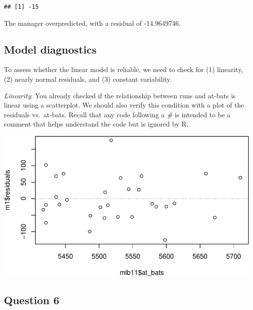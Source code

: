 \documentclass[]{article}
\newenvironment{Shaded}{\begin{snugshade}}{\end{snugshade}}
\newcommand{\KeywordTok}[1]{\textcolor[rgb]{0.13,0.29,0.53}{\textbf{#1}}}
\newcommand{\DataTypeTok}[1]{\textcolor[rgb]{0.13,0.29,0.53}{#1}}
\newcommand{\DecValTok}[1]{\textcolor[rgb]{0.00,0.00,0.81}{#1}}
\newcommand{\StringTok}[1]{\textcolor[rgb]{0.31,0.60,0.02}{#1}}
\newcommand{\CommentTok}[1]{\textcolor[rgb]{0.56,0.35,0.01}{\textit{#1}}}
\newcommand{\OperatorTok}[1]{\textcolor[rgb]{0.81,0.36,0.00}{\textbf{#1}}}
\newcommand{\NormalTok}[1]{#1}
\begin{document}
\begin{verbatim}
## [1] -15
\end{verbatim}

The manager overpredicted, with a residual of -14.9649746.

\subsection{Model diagnostics}\label{model-diagnostics}

To assess whether the linear model is reliable, we need to check for (1)
linearity, (2) nearly normal residuals, and (3) constant variability.

\emph{Linearity}: You already checked if the relationship between runs
and at-bats is linear using a scatterplot. We should also verify this
condition with a plot of the residuals vs.~at-bats. Recall that any code
following a \emph{\#} is intended to be a comment that helps understand
the code but is ignored by R.

\begin{Shaded}
\end{Shaded}

\includegraphics{DATA_606_Lab_7_files/figure-latex/residuals-1.pdf}

\subsection{Question 6}\label{question-6}
\end{document}
